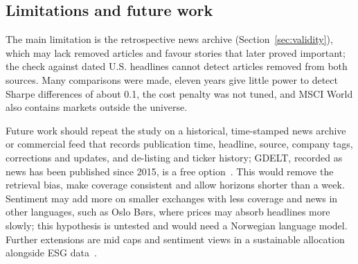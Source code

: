 \subsection{Limitations and future work}
The main limitation is the retrospective news archive (Section~\ref{sec:validity}), which may lack removed articles and favour stories that later proved important; the check against dated U.S. headlines cannot detect articles removed from both sources. Many comparisons were made, eleven years give little power to detect Sharpe differences of about 0.1, the cost penalty was not tuned, and MSCI World also contains markets outside the universe.

Future work should repeat the study on a historical, time-stamped news archive or commercial feed that records publication time, headline, source, company tags, corrections and updates, and de-listing and ticker history; GDELT, recorded as news has been published since 2015, is a free option~\cite{gdelt}. This would remove the retrieval bias, make coverage consistent and allow horizons shorter than a week. Sentiment may add more on smaller exchanges with less coverage and news in other languages, such as Oslo B{\o}rs, where prices may absorb headlines more slowly; this hypothesis is untested and would need a Norwegian language model. Further extensions are mid caps and sentiment views in a sustainable allocation alongside ESG data~\cite{frausig2026}.
